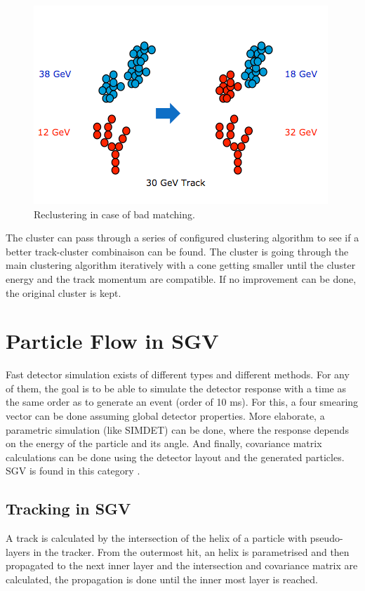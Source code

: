 \documentclass[a4paper,12pt]{article}
\begin{document}
\begin{figure}[!h]
   \centering
   \includegraphics[scale=0.5]{reclustering.png} 
      \caption{Reclustering in case of bad matching.}
   \label{fig:reclustering}
\end{figure}

The cluster can pass through a series of configured clustering algorithm to see if a better track-cluster combinaison can be found. The cluster is going through the main clustering algorithm iteratively with a cone getting smaller until the cluster energy and the track momentum are compatible. If no improvement can be done, the original cluster is kept.

\section{Particle Flow in SGV}

Fast detector simulation exists of different types and different methods. For any of them, the goal is to be able to simulate the detector response with a time as the same order as to generate an event (order of 10 ms).
For this, a four smearing vector can be done assuming global detector properties. More elaborate, a parametric simulation (like SIMDET) can be done, where the response depends on the energy of the particle and its angle.
And finally, covariance matrix calculations can be done using the detector layout and the generated particles. SGV is found in this category \cite{Berggren}.

\subsection{Tracking in SGV}

A track is calculated by the intersection of the helix of a particle with pseudo-layers in the tracker. From the outermost hit, an helix is parametrised and then propagated to the next inner layer and the intersection and covariance matrix are calculated, the propagation is done until the inner most layer is reached. 
\end{document}
